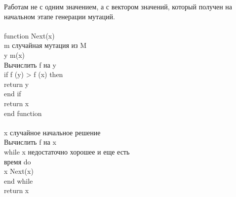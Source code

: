 Работам не с одним значением, а с вектором значений, который получен на начальном этапе генерации мутаций. \\
\\
function Next(x)  \\
\tab m \leftarrow случайная мутация из M  \\
\tab y \leftarrow m(x)  \\
\tab Вычислить f на y  \\
\tab if f (y) > f (x) then  \\
\tab\tab return y  \\
\tab end if  \\
\tab return x  \\
end function  \\
\\
x \leftarrow случайное начальное решение  \\
Вычислить f на x  \\
while x недостаточно хорошее и еще есть  \\
время do  \\
\tab x \leftarrow Next(x)  \\
end while   \\
return x \\
